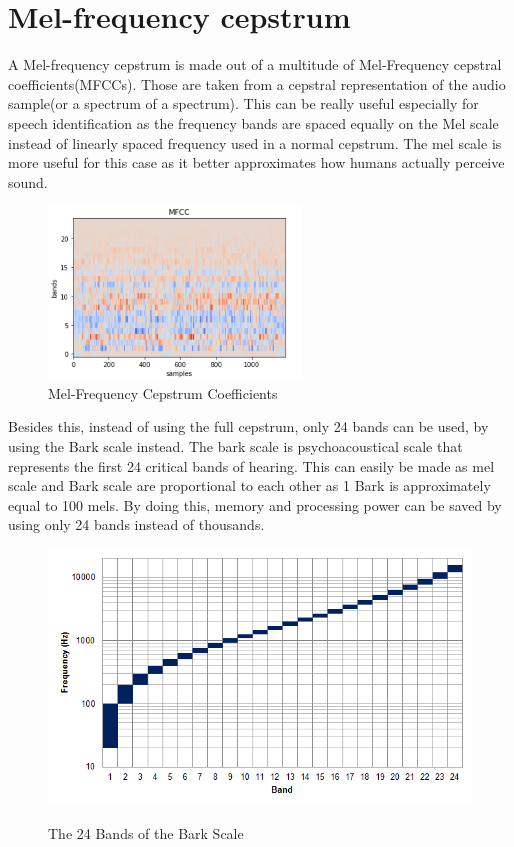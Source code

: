 \section{Mel-frequency cepstrum}
A Mel-frequency cepstrum is made out of a multitude of Mel-Frequency cepstral coefficients(MFCCs). 
Those are taken from a cepstral representation of the audio sample(or a spectrum of a spectrum).
This can be really useful especially for speech identification as the frequency bands are spaced 
equally on the Mel scale instead of linearly spaced frequency used in a normal cepstrum. 
The mel scale is more useful for this case as it better approximates how humans actually perceive sound.
\cite{MFCC}

\begin{figure}[htp]
	\centering
	\includegraphics[width = 0.6\textwidth]{Illustrations/mfcc.png}
	\caption{Mel-Frequency Cepstrum Coefficients}
	\label{fig:mfcc}
\end{figure}

\newpage
Besides this, instead of using the full cepstrum, only 24 bands can be used, 
by using the Bark scale instead.
The bark scale is psychoacoustical scale that represents the first 24 critical bands of hearing.
This can easily be made as mel scale and Bark scale are proportional to each other as 1 Bark 
is approximately equal to 100 mels.
By doing this, memory and processing power can be saved by using only 24 bands instead of thousands.
\cite{BARKSCALE}
\begin{figure}[htp]
	\centering
	\includegraphics[width=1\textwidth]{Illustrations/Bark_scale.png}
	\caption{The 24 Bands of the Bark Scale}\cite{BARKSCALEPHTOT}
	\label{fig:BarkScale}
\end{figure}

